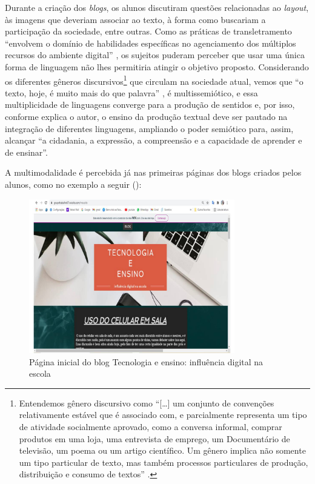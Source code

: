 \documentclass{textolivre}
\begin{document}
Durante a criação dos \emph{blogs}, os alunos discutiram questões relacionadas ao \emph{layout}, às imagens que deveriam associar ao texto, à forma como buscariam a participação da sociedade, entre outras.
Como as práticas de transletramento ``envolvem o domínio de habilidades específicas no agenciamento dos múltiplos recursos do ambiente digital''
\cite[p.~188]{sachs2011}, os sujeitos puderam perceber que usar uma única forma de linguagem não lhes permitiria atingir o objetivo proposto.
Considerando os diferentes gêneros
discursivos\footnote{Entendemos gênero discursivo como
  ``[\ldots] um conjunto de convenções relativamente estável que é associado com, e parcialmente representa um tipo de atividade socialmente aprovado, como a conversa informal, comprar produtos em uma loja, uma entrevista de emprego, um Documentário de televisão, um poema ou um artigo científico. Um gênero implica não somente um tipo
  particular de texto, mas também processos particulares de produção, distribuição e consumo de textos'' \cite[p.~161]{fairclough2001}.} que
circulam na sociedade atual, vemos que ``o texto, hoje, é muito mais do que palavra'' \cite[p.~71]{ribeiro2018}, é multissemiótico, e essa
multiplicidade de linguagens converge para a produção de sentidos e, por isso, conforme explica o autor, o ensino da produção textual deve ser pautado na integração de diferentes linguagens, ampliando o poder
semiótico para, assim, alcançar ``a cidadania, a expressão, a compreensão e a capacidade de aprender e de ensinar''.

A multimodalidade é percebida já nas primeiras páginas dos blogs criados pelos alunos, como no exemplo a seguir ():

\begin{figure}[h]
    \centering
    \includegraphics[width=0.8\textwidth]{figure02.png}
    \caption{Página inicial do blog Tecnologia e ensino: influência digital na escola}
    \label{fig02}
\end{figure}
\end{document}
